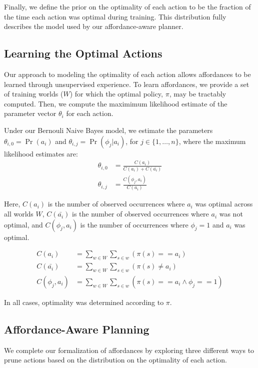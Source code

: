 \documentclass[letterpaper]{article}
\newcommand{\argmax}{\operatornamewithlimits{argmax}} %
\begin{document}
Finally, we define the prior on the optimality of each action to be the fraction of the
time each action was optimal during training. This distribution fully describes the model used by our affordance-aware planner. 

\subsection{Learning the Optimal Actions}
Our approach to modeling the optimality of each action allows affordances to be learned through unsupervised experience.
To learn affordances, we provide a set of training worlds ($W$) for which the optimal policy, $\pi$,
may be tractably computed. Then, we compute the maximimum likelihood estimate of the parameter vector $\theta_i$ for each action.

Under our Bernouli Naive Bayes model, we estimate the parameters
$\theta_{i,0} = \Pr(a_i)$ and $\theta_{i,j} = \Pr(\phi_j | a_i)$, for $j \in \{1, \ldots, n \}$, where the maximum likelihood estimates are:
\begin{align}
\theta_{i,0} &= \frac{C(a_i)}{C(a_i) + C(\bar{a_i})} \\
\theta_{i,j} &= \frac{C(\phi_j, a_i)}{C(a_i)}
\end{align}

Here, $C(a_i)$ is the number of observed occurrences where $a_i$ was optimal across all worlds $W$,
$C(\bar{a_i})$ is the number of observed occurrences where $a_i$ was not optimal,
and $C(\phi_j, a_i)$ is the number of occurrences where $\phi_j=1$ and $a_i$ was optimal.

\begin{align}
C(a_i) &= \sum_{w \in W} \sum_{s \in w} (\pi(s) == a_i) \\
C(\bar{a_i}) &= \sum_{w \in W} \sum_{s \in w} (\pi(s) \not= a_i) \\
C(\phi_j, a_i) &= \sum_{w \in W} \sum_{s \in w} (\pi(s) == a_i \wedge \phi_j == 1)
\end{align}

In all cases, optimality was determined according to $\pi$.

\subsection{Affordance-Aware Planning}
\label{sec:action_pruning}
We complete our formalization of affordances by exploring three different ways to prune actions
based on the distribution on the optimality of each action.
\end{document}
